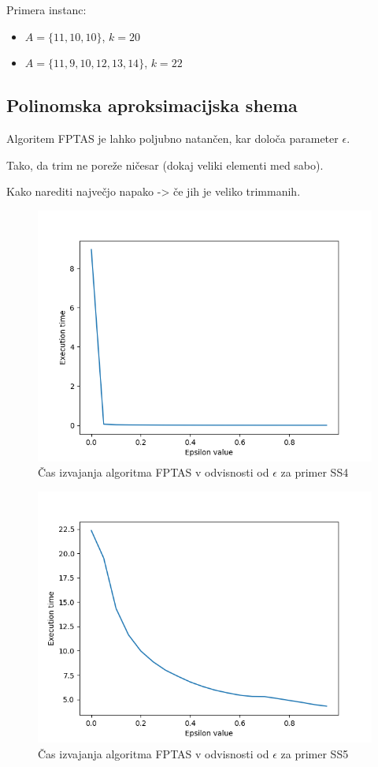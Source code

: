 \documentclass{article}
\begin{document}
Primera instanc:
\begin{itemize}
	\item $A = \{ 11, 10, 10 \}$, $k = 20$
	\item $A = \{ 11, 9, 10, 12, 13, 14 \}$, $k = 22$
\end{itemize}


\subsection{Polinomska aproksimacijska shema}

Algoritem FPTAS je lahko poljubno natančen, kar določa parameter $\epsilon$.


Tako, da trim ne poreže ničesar (dokaj veliki elementi med sabo).

Kako narediti največjo napako -> če jih je veliko trimmanih.


\begin{figure}
	\centering
	\includegraphics[width=0.8\linewidth]{figs/ss4.png}
	\caption{Čas izvajanja algoritma FPTAS v odvisnosti od $\epsilon$ za primer SS4}
	\label{fig:ss4}
\end{figure}

\begin{figure}
	\centering
	\includegraphics[width=0.8\linewidth]{figs/ss5.png}
	\caption{Čas izvajanja algoritma FPTAS v odvisnosti od $\epsilon$ za primer SS5}
	\label{fig:ss5}
\end{figure}
\end{document}
